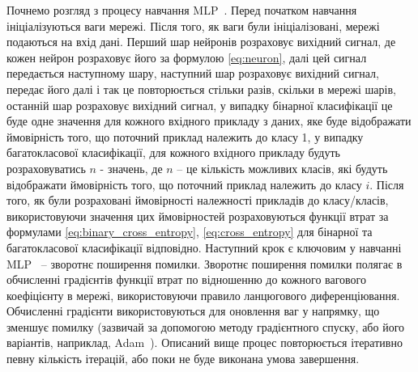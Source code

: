 Почнемо розгляд з  процесу навчання MLP~\cite{ct26}. Перед початком навчання ініціалізуються ваги мережі. Після того, як ваги були ініціалізовані, мережі подаються на вхід дані. Перший шар нейронів розраховує вихідний сигнал, де кожен нейрон розраховує його за формулою \ref{eq:neuron}, далі цей сигнал передається наступному шару, наступний шар розраховує вихідний сигнал, передає його далі і так це повторюється стільки разів, скільки в мережі шарів, останній шар розраховує вихідний сигнал, у випадку бінарної класифікації це буде одне значення для кожного вхідного прикладу з даних, яке буде відображати ймовірність того, що поточний приклад належить до класу 1, у випадку багатокласової класифікації, для кожного вхідного прикладу будуть розраховуватись $n$ - значень, де $n$ -- це кількість можливих класів, які будуть відображати ймовірність того, що поточний приклад належить до класу $i$. Після того, як були розраховані ймовірності належності прикладів до класу/класів, використовуючи значення цих ймовірностей розраховуються функції втрат за формулами \ref{eq:binary_cross_entropy}, \ref{eq:cross_entropy} для бінарної та багатокласової класифікації відповідно. Наступний крок є ключовим у навчанні MLP~\cite{ct26} -- зворотнє поширення помилки. Зворотнє поширення помилки полягає в обчисленні градієнтів функції втрат по відношенню до кожного вагового коефіцієнту в мережі, використовуючи правило ланцюгового диференціювання. Обчисленні градієнти використовуються для оновлення ваг у напрямку, що зменшує помилку (зазвичай за допомогою методу градієнтного спуску, або його варіантів, наприклад, Adam~\cite{ct9}). Описаний вище процес повторюється ітеративно певну кількість ітерацій, або поки не буде виконана умова завершення.

